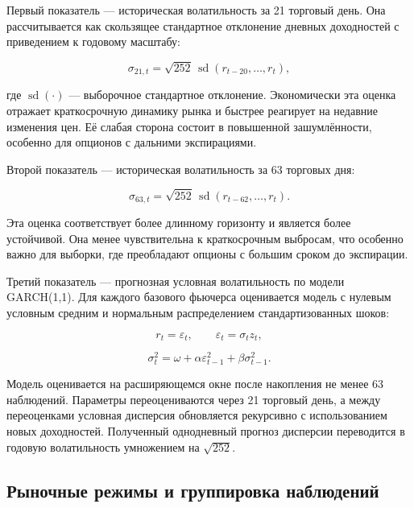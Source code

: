 \documentclass[11pt,a4paper]{article}
\begin{document}
Первый показатель --- историческая волатильность за 21 торговый день. Она рассчитывается как скользящее стандартное отклонение дневных доходностей с приведением к годовому масштабу:

\begin{equation}
\sigma_{21,t} = \sqrt{252}\,\operatorname{sd}(r_{t-20},\ldots,r_t),
\end{equation}

где $\operatorname{sd}(\cdot)$ --- выборочное стандартное отклонение. Экономически эта оценка отражает краткосрочную динамику рынка и быстрее реагирует на недавние изменения цен. Её слабая сторона состоит в повышенной зашумлённости, особенно для опционов с дальними экспирациями.

Второй показатель --- историческая волатильность за 63 торговых дня:

\begin{equation}
\sigma_{63,t} = \sqrt{252}\,\operatorname{sd}(r_{t-62},\ldots,r_t).
\end{equation}

Эта оценка соответствует более длинному горизонту и является более устойчивой. Она менее чувствительна к краткосрочным выбросам, что особенно важно для выборки, где преобладают опционы с большим сроком до экспирации.

Третий показатель --- прогнозная условная волатильность по модели GARCH(1,1). Для каждого базового фьючерса оценивается модель с нулевым условным средним и нормальным распределением стандартизованных шоков:

\begin{equation}
r_t = \varepsilon_t, \qquad \varepsilon_t = \sigma_t z_t,
\end{equation}

\begin{equation}
\sigma_t^2 = \omega + \alpha \varepsilon_{t-1}^2 + \beta \sigma_{t-1}^2.
\end{equation}

Модель оценивается на расширяющемся окне после накопления не менее 63 наблюдений. Параметры переоцениваются через 21 торговый день, а между переоценками условная дисперсия обновляется рекурсивно с использованием новых доходностей. Полученный однодневный прогноз дисперсии переводится в годовую волатильность умножением на $\sqrt{252}$.

\subsection{Рыночные режимы и группировка наблюдений}
\end{document}
